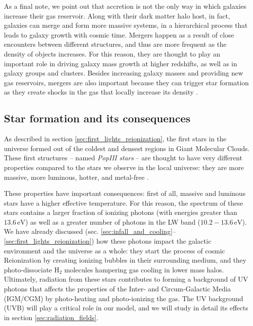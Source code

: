   As a final note, we point out that accretion is not the only way in which galaxies increase their gas reservoir. Along with their dark matter halo host, in fact, galaxies can merge and form more massive systems, in a hierarchical process that leads to galaxy growth with cosmic time. Mergers happen as a result of close encounters between different structures, and thus are more frequent as the density of objects increases. For this reason, they are thought to play an important role in driving galaxy mass growth at higher redshifts, as well as in galaxy groups and clusters. Besides increasing galaxy masses and providing new gas reservoirs, mergers are also important because they can trigger star formation as they create shocks in the gas that locally increase its density \citep{conselice_mergers}. 

  \subsection{Star formation and its consequences} \label{sec:star_formation}

  As described in section \ref{sec:first_lights_reionization}, the first stars in the universe formed out of the coldest and densest regions in Giant Molecular Clouds. These first structures -- named \textit{PopIII stars} -- are thought to have very different properties compared to the stars we observe in the local universe: they are more massive, more luminous, hotter, and metal-free \citep{haemmerle2020formation}. 
  
  These properties have important consequences: first of all, massive and luminous stars have a higher effective temperature. For this reason, the spectrum of these stars contains a larger fraction of ionizing photons (with energies greater than $13.6\,\mathrm{eV}$) as well as a greater number of photons in the LW band ($10.2-13.6\,\mathrm{eV}$). We have already discussed (sec. \ref{sec:infall_and_cooling}--\ref{sec:first_lights_reionization}) how these photons impact the galactic environment and the universe as a whole: they start the process of cosmic Reionization by creating ionizing bubbles in their surrounding medium, and they photo-dissociate $\mathrm{H}_2$ molecules hampering gas cooling in lower mass halos. Ultimately, radiation from these stars contributes to forming a background of UV photons that affects the properties of the Inter- and Circum-Galactic Media (IGM/CGM) by photo-heating and photo-ionizing the gas. The UV background (UVB) will play a critical role in our model, and we will study in detail its effects in section \ref{sec:radiation_fields}. 
  
